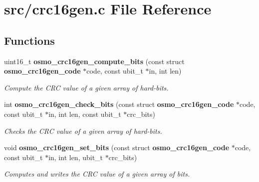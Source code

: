 \section{src/crc16gen.c File Reference}
\label{crc16gen_8c}
\subsection*{Functions}
\begin{DoxyCompactItemize}
\item 
uint16\-\_\-t {\bf osmo\-\_\-crc16gen\-\_\-compute\-\_\-bits} (const struct {\bf osmo\-\_\-crc16gen\-\_\-code} $\ast$code, const ubit\-\_\-t $\ast$in, int len)
\begin{DoxyCompactList}\small\item\em Compute the C\-R\-C value of a given array of hard-\/bits. \end{DoxyCompactList}\item 
int {\bf osmo\-\_\-crc16gen\-\_\-check\-\_\-bits} (const struct {\bf osmo\-\_\-crc16gen\-\_\-code} $\ast$code, const ubit\-\_\-t $\ast$in, int len, const ubit\-\_\-t $\ast$crc\-\_\-bits)
\begin{DoxyCompactList}\small\item\em Checks the C\-R\-C value of a given array of hard-\/bits. \end{DoxyCompactList}\item 
void {\bf osmo\-\_\-crc16gen\-\_\-set\-\_\-bits} (const struct {\bf osmo\-\_\-crc16gen\-\_\-code} $\ast$code, const ubit\-\_\-t $\ast$in, int len, ubit\-\_\-t $\ast$crc\-\_\-bits)
\begin{DoxyCompactList}\small\item\em Computes and writes the C\-R\-C value of a given array of bits. \end{DoxyCompactList}\end{DoxyCompactItemize}
